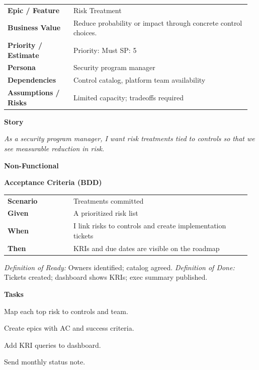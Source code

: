 \documentclass[11pt,letterpaper]{article}
\makeatletter
\newenvironment{kvtable}{%
  \par\noindent\begin{tabular}{@{}>{\raggedright\bfseries\arraybackslash}p{0.26\linewidth} >{\raggedright\arraybackslash}p{0.70\linewidth}@{}}
}{\end{tabular}\par}
\newenvironment{bdd}{%
  \par\noindent\begin{tabular}{@{}>{\raggedright\bfseries\arraybackslash}p{0.26\linewidth} >{\raggedright\arraybackslash}p{0.70\linewidth}@{}}
}{\end{tabular}\par}
\newcommand{\DoRDoD}[2]{%
  \vspace{0.35em}
  {\footnotesize\color{Muted}%
    \textit{Definition of Ready:} #1 \; \textbullet\;
    \textit{Definition of Done:} #2%
  }%
}
\newenvironment{storycard}[2]{%
  \begin{tcolorbox}[cloudcard, title={#1 --- #2}]%
}{\end{tcolorbox}}
\newcommand{\sectionlabel}[1]{\par\vspace{0.35em}\textbf{#1}\par}
\makeatother
\begin{document}
\begin{storycard}{CCS-7}{Ch. 7 — Managing Risk in the Cloud}
\begin{kvtable}
Epic / Feature & Risk Treatment\\
Business Value & Reduce probability or impact through concrete control choices.\\
Priority / Estimate & Priority: Must \quad SP: 5\\
Persona & Security program manager\\
Dependencies & Control catalog, platform team availability\\
Assumptions / Risks & Limited capacity; tradeoffs required\\
\end{kvtable}
\sectionlabel{Story}
\textit{As a security program manager, I want risk treatments tied to controls so that we see measurable reduction in risk.}
\sectionlabel{Non-Functional}\;
\sectionlabel{Acceptance Criteria (BDD)}
\begin{bdd}
Scenario & Treatments committed\\
Given & A prioritized risk list\\
When & I link risks to controls and create implementation tickets\\
Then & KRIs and due dates are visible on the roadmap\\
\end{bdd}
\DoRDoD{Owners identified; catalog agreed.}{Tickets created; dashboard shows KRIs; exec summary published.}
\sectionlabel{Tasks}
\begin{checklist}
\item Map each top risk to controls and team.
\item Create epics with AC and success criteria.
\item Add KRI queries to dashboard.
\item Send monthly status note.
\end{checklist}
\end{storycard}
\end{document}
